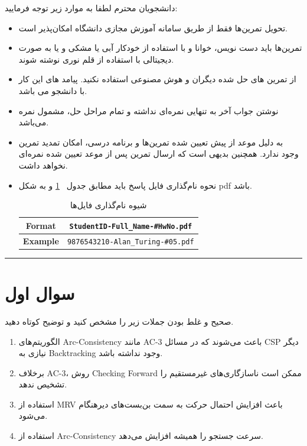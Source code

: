 \documentclass[a4paper,10pt]{article}
\begin{document}
دانشجویان محترم لطفا به موارد زیر توجه فرمایید:
\begin{itemize}
\itemsep0em
\item
	تحويل تمرين‌ها فقط از طريق سامانه  آموزش مجازی دانشگاه امکان‌‌پذیر است.
\item 
	تمرین‌ها باید دست نویس، خوانا و با استفاده از خودکار آبی یا مشکی و یا به صورت دیجیتالی با استفاده از قلم نوری نوشته شوند. 
\item
از تمرین های حل شده دیگران و هوش مصنوعی استفاده نکنید. پیامد های این کار با دانشجو می باشد.
\item
	نوشتن جواب آخر به تنهايى نمره‌ای نداشته و تمام مراحل حل، مشمول نمره می‌باشد.
\item 
	به دلیل موعد از پیش تعیین شده تمرین‌ها و برنامه درسی، امکان تمدید تمرین وجود ندارد. همچنین بدیهی است که ارسال تمرین پس از موعد تعیین شده نمره‌ای نخواهد داشت.
	
\item نحوه نام‌گذاری فایل پاسخ باید مطابق جدول ~\ref{tab:file_format}
و به شکل pdf باشد.

\begin{table}[h]
	\centering
	\begin{tabular}{|c|c|}
		\hline
		\textbf{Format} & \texttt{StudentID-Full\_Name-\#HwNo.pdf} \\
		\hline
		\textbf{Example} & \texttt{9876543210-Alan\_Turing-\#05.pdf} \\
		\hline
	\end{tabular}
	\caption{شیوه نام‌گذاری فایل‌ها}
	\label{tab:file_format}
\end{table}
    
    
\end{itemize}
\rule{\linewidth}{0.4pt}




\section{سوال اول}

صحیح و غلط بودن جملات زیر را مشخص کنید و توضیح کوتاه دهید.

\begin{enumerate}
    \item الگوریتم‌های Arc-Consistency مانند AC-3 باعث می‌شوند که در مسائل CSP دیگر نیازی به Backtracking وجود نداشته باشد.\\

    \item برخلاف AC-3، روش Checking Forward ممکن است ناسازگاری‌های غیرمستقیم  را تشخیص ندهد.\\

    \item استفاده از MRV باعث افزایش احتمال حرکت به سمت بن‌بست‌های دیرهنگام می‌شود.\\
    
    \item استفاده از Arc-Consistency سرعت جستجو را همیشه افزایش می‌دهد.\\

\end{enumerate}
\end{document}
